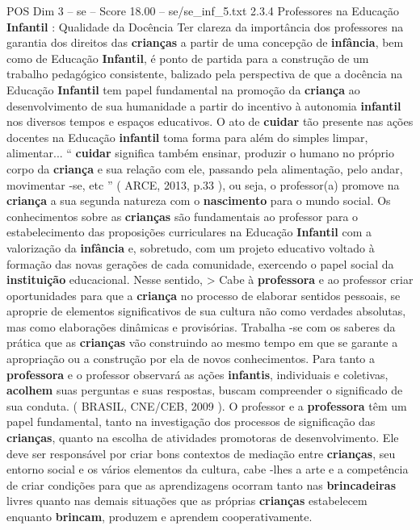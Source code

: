 \begin{textsample}{POS Dim 3 – se – Score 18.00 – se/se\_inf\_5.txt}  \label{ex:f3_pos_163}
2.3.4 Professores na Educação \textbf{Infantil} : Qualidade da Docência Ter clareza da importância dos professores na garantia dos direitos das \textbf{crianças} a partir de uma concepção de \textbf{infância}, bem como de Educação \textbf{Infantil}, é ponto de partida para a construção de um trabalho pedagógico consistente, balizado pela perspectiva de que a docência na Educação \textbf{Infantil} tem papel fundamental na promoção da \textbf{criança} ao desenvolvimento de sua humanidade a partir do incentivo à autonomia \textbf{infantil} nos diversos tempos e espaços educativos.
O ato de \textbf{cuidar} tão presente nas ações docentes na Educação \textbf{infantil} toma forma para além do simples limpar, alimentar... “ \textbf{cuidar} significa também ensinar, produzir o humano no próprio corpo da \textbf{criança} e sua relação com ele, passando pela alimentação, pelo andar, movimentar -se, etc ” ( ARCE, 2013, p.33 ), ou seja, o professor(a) promove na \textbf{criança} a sua segunda natureza com o \textbf{nascimento} para o mundo social.
Os conhecimentos sobre as \textbf{crianças} são fundamentais ao professor para o estabelecimento das proposições curriculares na Educação \textbf{Infantil} com a valorização da \textbf{infância} e, sobretudo, com um projeto educativo voltado à formação das novas gerações de cada comunidade, exercendo o papel social da \textbf{instituição} educacional.
Nesse sentido, > Cabe à \textbf{professora} e ao professor criar oportunidades para que a \textbf{criança} no processo de elaborar sentidos pessoais, se aproprie de elementos significativos de sua cultura não como verdades absolutas, mas como elaborações dinâmicas e provisórias.
Trabalha -se com os saberes da prática que as \textbf{crianças} vão construindo ao mesmo tempo em que se garante a apropriação ou a construção por ela de novos conhecimentos.
Para tanto a \textbf{professora} e o professor observará as ações \textbf{infantis}, individuais e coletivas, \textbf{acolhem} suas perguntas e suas respostas, buscam compreender o significado de sua conduta. ( BRASIL, CNE/CEB, 2009 ).
O professor e a \textbf{professora} têm um papel fundamental, tanto na investigação dos processos de significação das \textbf{crianças}, quanto na escolha de atividades promotoras de desenvolvimento.
Ele deve ser responsável por criar bons contextos de mediação entre \textbf{crianças}, seu entorno social e os vários elementos da cultura, cabe -lhes a arte e a competência de criar condições para que as aprendizagens ocorram tanto nas \textbf{brincadeiras} livres quanto nas demais situações que as próprias \textbf{crianças} estabelecem enquanto \textbf{brincam}, produzem e aprendem cooperativamente.

\end{textsample}
